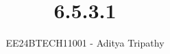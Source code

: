 \documentclass[journal]{IEEEtran}
\begin{document}

\vspace{3cm}

\title{6.5.3.1}
\author{EE24BTECH11001 - Aditya Tripathy}
 \maketitle
{\let\newpage\relax\maketitle}

\renewcommand{\thefigure}{\theenumi}
\renewcommand{\thetable}{\theenumi}
\setlength{\intextsep}{10pt} %


\renewcommand{\thetable}{\theenumi}
\end{document}
